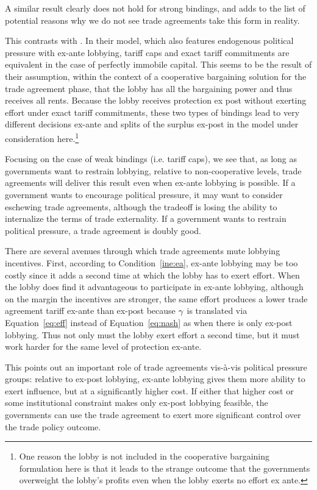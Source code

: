 A similar result clearly does not hold for strong bindings, and adds to the list of potential reasons why we do not see trade agreements take this form in reality.

This contrasts with \Textcite{mrc2007}. In their model, which also features endogenous political pressure with ex-ante lobbying, tariff caps and exact tariff commitments are equivalent in the case of perfectly immobile capital. This seems to be the result of their assumption, within the context of a cooperative bargaining solution for the trade agreement phase, that the lobby has all the bargaining power and thus receives all rents. Because the lobby receives protection ex post without exerting effort under exact tariff commitments, these two types of bindings lead to very different decisions ex-ante and splits of the surplus ex-post in the model under consideration here.\footnote{One reason the lobby is not included in the cooperative bargaining formulation here is that it leads to the strange outcome that the governments overweight the lobby's profits even when the lobby exerts no effort ex ante.}

Focusing on the case of weak bindings (i.e. tariff caps), we see that, as long as governments want to restrain lobbying, relative to non-cooperative levels, trade agreements will deliver this result even when ex-ante lobbying is possible. If a government wants to encourage political pressure, it may want to consider eschewing trade agreements, although the tradeoff is losing the ability to internalize the terms of trade externality. If a government wants to restrain political pressure, a trade agreement is doubly good.

There are several avenues through which trade agreements mute lobbying incentives. First, according to Condition~\ref{ine:ea}, ex-ante lobbying may be too costly since it adds a second time at which the lobby has to exert effort. When the lobby does find it advantageous to participate in ex-ante lobbying, although on the margin the incentives are stronger, the same effort produces a lower trade agreement tariff ex-ante than ex-post because $\gamma$ is translated via Equation~\ref{eq:eff} instead of Equation~\ref{eq:nash} as when there is only ex-post lobbying. Thus not only must the lobby exert effort a second time, but it must work harder for the same level of protection ex-ante.

This points out an important role of trade agreements vis-\`{a}-vis political pressure groups: relative to ex-post lobbying, ex-ante lobbying gives them more ability to exert influence, but at a significantly higher cost. If either that higher cost or some institutional constraint makes only ex-post lobbying feasible, the governments can use the trade agreement to exert more significant control over the trade policy outcome.

%